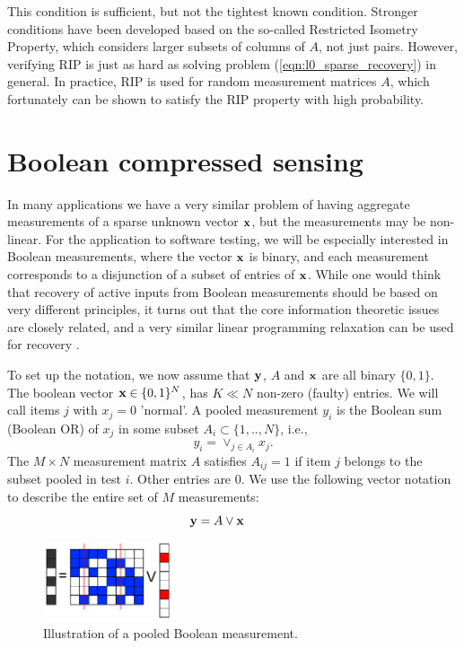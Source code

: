 This condition is sufficient, but not the tightest known condition.
Stronger conditions have been developed based on the so-called Restricted Isometry Property,
\cite{candes2008_RIP} which considers larger subsets of columns of $A$, not just pairs.
However, verifying RIP is just as hard as solving problem (\ref{eqn:l0_sparse_recovery}) in general. In practice, RIP is used for random measurement
matrices $A$, which fortunately can be shown to satisfy the RIP property with high probability. \\


\section{ Boolean compressed sensing}
\label{s:boolean_compressed_sensing}
In many applications we have a very similar problem of having aggregate measurements
of a sparse unknown vector $\mathbf{x}$, but the measurements may be non-linear.  For the application
to software testing, we will be especially interested in Boolean measurements, where the
vector $\mathbf{x}$ is binary, and each measurement corresponds to a disjunction of a subset
of entries of $\mathbf{x}$.  While one would think that recovery of active inputs from
Boolean measurements should be based on very different principles, it turns
out that the core information theoretic issues are closely related, and a very similar linear
programming relaxation can be used for recovery \cite{Malyutov78,MalioutovM2012}.

To set up the notation, we now assume that $\mathbf{y}$, $A$ and $\mathbf{x}$ are all binary $\{0, 1\}$.
The boolean vector $\mathbf{x} \in \{0, 1\}^N$, has $K \ll N$ non-zero (faulty) entries.
We will call items $j$ with $x_j = 0$ 'normal'. A pooled measurement $y_i$ is the
Boolean sum (Boolean OR) of $x_j$ in some subset $A_i \subset \{1,..,N\}$, i.e.,
\begin{equation}
y_i = \vee_{j \in A_i} x_j.
\end{equation}
The $M \times N$ measurement matrix $A$ satisfies $A_{ij} = 1$ if item $j$ belongs
to the subset pooled in test $i$. Other entries are $0$. We use the following vector
notation to describe the entire set of $M$ measurements:
\begin{equation*}
\mathbf{y} = A \vee \mathbf{x}~~~~~~~~
\end{equation*}

\begin{figure}[!thb]
\centering
\includegraphics[width=1.5in]{./fig_group_test.pdf}
\caption{  Illustration of a pooled Boolean measurement.}
\label{fig:group_testing}
\end{figure}

